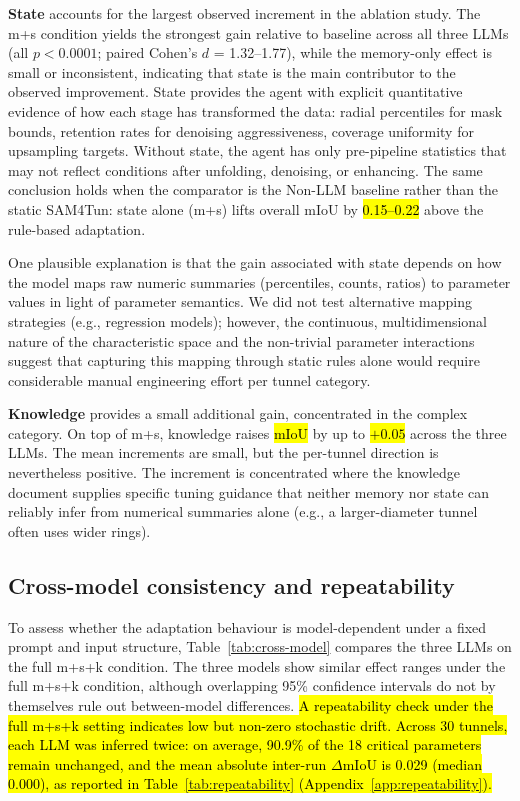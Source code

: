 \documentclass[a4paper,fleqn]{cas-dc}
\begin{document}
{\textbf{State} accounts for the largest observed increment in the ablation study. The m+s condition yields the strongest gain relative to baseline across all three LLMs (all $p < 0.0001$; paired Cohen's \mbox{$d$} = 1.32--1.77), while the memory-only effect is small or inconsistent, indicating that state is the main contributor to the observed improvement. State provides the agent with explicit quantitative evidence of how each stage has transformed the data: radial percentiles for mask bounds, retention rates for denoising aggressiveness, coverage uniformity for upsampling targets. Without state, the agent has only pre-pipeline statistics that may not reflect conditions after unfolding, denoising, or enhancing. The same conclusion holds when the comparator is the Non-LLM baseline rather than the static SAM4Tun: state alone (m+s) lifts overall mIoU by \hl{0.15--0.22} above the rule-based adaptation.


One plausible explanation is that the gain associated with state depends on how the model maps raw numeric summaries (percentiles, counts, ratios) to parameter values in light of parameter semantics. We did not test alternative mapping strategies (e.g., regression models); however, the continuous, multidimensional nature of the characteristic space and the non-trivial parameter interactions suggest that capturing this mapping through static rules alone would require considerable manual engineering effort per tunnel category.

\textbf{Knowledge} provides a small additional gain, concentrated in the complex category. On top of m+s, knowledge raises \hl{mIoU} by up to \hl{$+0.05$} across the three LLMs. The mean increments are small, but the per-tunnel direction is nevertheless positive. The increment is concentrated where the knowledge document supplies specific tuning guidance that neither memory nor state can reliably infer from numerical summaries alone (e.g.,  a larger-diameter tunnel often uses wider rings).


\subsection{Cross-model consistency and repeatability}\label{sec:consistency}

To assess whether the adaptation behaviour is model-dependent under a fixed prompt and input structure, Table~\ref{tab:cross-model} compares the three LLMs on the full m+s+k condition. The three models show similar effect ranges under the full m+s+k condition, although overlapping 95\% confidence intervals do not by themselves rule out between-model differences.
\hl{A repeatability check under the full \mbox{m+s+k} setting indicates low but non-zero stochastic drift. Across 30 tunnels, each LLM was inferred twice: on average, 90.9\% of the 18 critical parameters remain unchanged, and the mean absolute inter-run \mbox{$\Delta$}mIoU is 0.029 (median 0.000), as reported in Table~\ref{tab:repeatability} (Appendix~\ref{app:repeatability}).}

}
\end{document}
